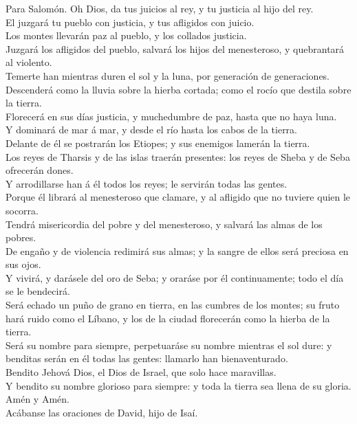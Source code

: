  Para Salomón. Oh Dios, da tus juicios al rey, y tu
justicia al hijo del rey.\\
 El juzgará tu pueblo con justicia, y tus afligidos con
juicio.\\
 Los montes llevarán paz al pueblo, y los collados
justicia.\\
 Juzgará los afligidos del pueblo, salvará los hijos del
menesteroso, y quebrantará al violento.\\
 Temerte han mientras duren el sol y la luna, por
generación de generaciones.\\
 Descenderá como la lluvia sobre la hierba cortada; como
el rocío que destila sobre la tierra.\\
 Florecerá en sus días justicia, y muchedumbre de paz,
hasta que no haya luna.\\
 Y dominará de mar á mar, y desde el río hasta los cabos
de la tierra.\\
 Delante de él se postrarán los Etiopes; y sus enemigos
lamerán la tierra.\\
 Los reyes de Tharsis y de las islas traerán presentes:
los reyes de Sheba y de Seba ofrecerán dones.\\
 Y arrodillarse han á él todos los reyes; le servirán
todas las gentes.\\
 Porque él librará al menesteroso que clamare, y al
afligido que no tuviere quien le socorra.\\
 Tendrá misericordia del pobre y del menesteroso, y
salvará las almas de los pobres.\\
 De engaño y de violencia redimirá sus almas; y la sangre
de ellos será preciosa en sus ojos.\\
 Y vivirá, y darásele del oro de Seba; y oraráse por él
continuamente; todo el día se le bendecirá.\\
 Será echado un puño de grano en tierra, en las cumbres
de los montes; su fruto hará ruido como el Líbano, y los de la ciudad
florecerán como la hierba de la tierra.\\
 Será su nombre para siempre, perpetuaráse su nombre
mientras el sol dure: y benditas serán en él todas las gentes: llamarlo
han bienaventurado.\\
 Bendito Jehová Dios, el Dios de Israel, que solo hace
maravillas.\\
 Y bendito su nombre glorioso para siempre: y toda la
tierra sea llena de su gloria. Amén y Amén.\\
 Acábanse las oraciones de David, hijo de Isaí.


